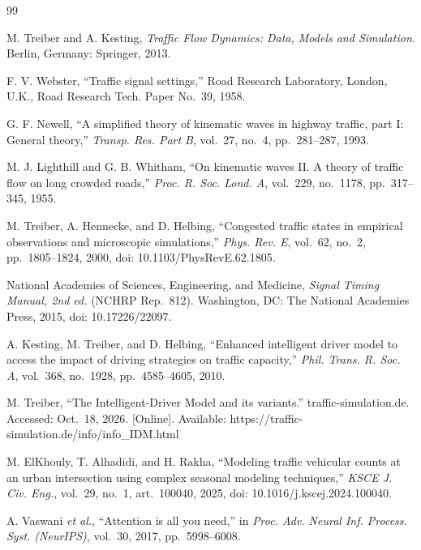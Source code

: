 \documentclass[letterpaper,12pt,conference]{ieeeconf}
\begin{document}
\begin{thebibliography}{99}
\footnotesize

M. Treiber and A. Kesting, \textit{Traffic Flow Dynamics: Data,
Models and Simulation}. Berlin, Germany: Springer, 2013.

F. V. Webster, ``Traffic signal settings,'' Road Research
Laboratory, London, U.K., Road Research Tech. Paper No.~39, 1958.

G. F. Newell, ``A simplified theory of kinematic waves in highway
traffic, part I: General theory,'' \textit{Transp. Res. Part B},
vol.~27, no.~4, pp.~281--287, 1993.

M. J. Lighthill and G. B. Whitham, ``On kinematic waves II. A
theory of traffic flow on long crowded roads,'' \textit{Proc. R.
Soc. Lond. A}, vol.~229, no.~1178, pp.~317--345, 1955.

M. Treiber, A. Hennecke, and D. Helbing, ``Congested traffic
states in empirical observations and microscopic simulations,''
\textit{Phys. Rev. E}, vol.~62, no.~2, pp.~1805--1824, 2000,
doi: 10.1103/PhysRevE.62.1805.

National Academies of Sciences, Engineering, and Medicine,
\textit{Signal Timing Manual, 2nd ed.} (NCHRP Rep.~812).
Washington, DC: The National Academies Press, 2015,
doi: 10.17226/22097.

A. Kesting, M. Treiber, and D. Helbing, ``Enhanced intelligent
driver model to access the impact of driving strategies on traffic
capacity,'' \textit{Phil. Trans. R. Soc. A}, vol.~368, no.~1928,
pp.~4585--4605, 2010.

M. Treiber, ``The Intelligent-Driver Model and its variants.''
traffic-simulation.de. Accessed: Oct.~18, 2026. [Online].
Available: https://traffic-simulation.de/info/info\_IDM.html

M. ElKhouly, T. Alhadidi, and H. Rakha, ``Modeling traffic
vehicular counts at an urban intersection using complex seasonal
modeling techniques,'' \textit{KSCE J. Civ. Eng.}, vol.~29, no.~1,
art.~100040, 2025, doi: 10.1016/j.kscej.2024.100040.

A. Vaswani \textit{et al.}, ``Attention is all you need,'' in
\textit{Proc. Adv. Neural Inf. Process. Syst. (NeurIPS)}, vol.~30,
2017, pp.~5998--6008.


\end{thebibliography}
\end{document}
